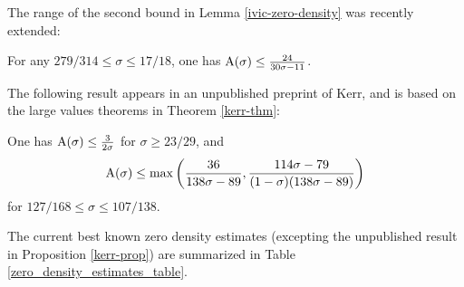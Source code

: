 The range of the second bound in Lemma \ref{ivic-zero-density} was recently extended:

\begin{theorem}\label{cdv-density}\cite{chen_debruyne_vindas_density_2024}  For any $279/314 \leq \sigma \leq 17/18$, one has $\mathrm{A}(\sigma) \leq \frac{24}{30\sigma-11}$.
\end{theorem}
\literature
{}

The following result appears in an unpublished preprint of Kerr, and is based on the large values theorems in Theorem \ref{kerr-thm}:

\begin{proposition}\label{kerr-prop}\cite[Theorems 6, 7]{kerr} One has $\mathrm{A}(\sigma) \leq \frac{3}{2\sigma}$ for $\sigma \geq 23/29$, and
$$\mathrm{A}(\sigma) \leq \max\left( \frac{36}{138\sigma-89}, \frac{114\sigma-79}{(1-\sigma)(138\sigma-89)} \right)$$
for $127/168 \leq \sigma \leq 107/138$.
\end{proposition}

The current best known zero density estimates (excepting the unpublished result in Proposition \ref{kerr-prop}) are summarized in Table \ref{zero_density_estimates_table}.

\derived
{}


